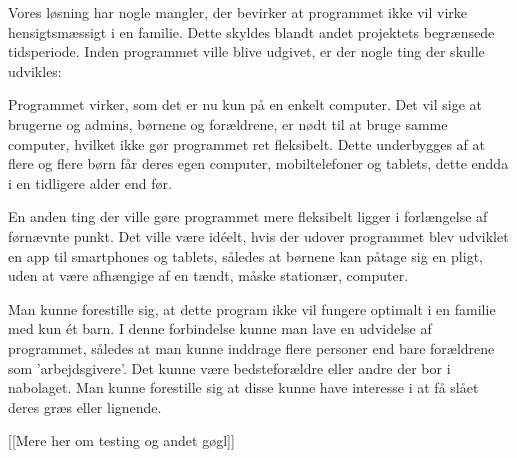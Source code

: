 Vores løsning har nogle mangler, der bevirker at programmet ikke vil virke hensigtsmæssigt i en familie. Dette skyldes blandt andet projektets begrænsede tidsperiode. Inden programmet ville blive udgivet, er der nogle ting der skulle udvikles:

Programmet virker, som det er nu kun på en enkelt computer. Det vil sige at brugerne og admins, børnene og forældrene, er nødt til at bruge samme computer, hvilket ikke gør programmet ret fleksibelt. Dette underbygges af at flere og flere børn får deres egen computer, mobiltelefoner og tablets, dette endda i en tidligere alder end før.\cite{MobilAlder}

En anden ting der ville gøre programmet mere fleksibelt ligger i forlængelse af førnævnte punkt. Det ville være idéelt, hvis der udover programmet blev udviklet en app til smartphones og tablets, således at børnene kan påtage sig en pligt, uden at være afhængige af en tændt, måske stationær, computer.

Man kunne forestille sig, at dette program ikke vil fungere optimalt i en familie med kun ét barn. I denne forbindelse kunne man lave en udvidelse af programmet, således at man kunne inddrage flere personer end bare forældrene som 'arbejdsgivere'. Det kunne være bedsteforældre eller andre der bor i nabolaget. Man kunne forestille sig at disse kunne have interesse i at få slået deres græs eller lignende.

[[Mere her om testing og andet gøgl]]

